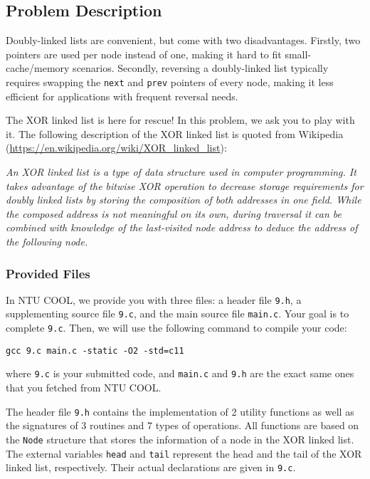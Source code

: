 \setcounter{secnumdepth}{0}

\subsection{Problem Description}\label{problem-description}

Doubly-linked lists are convenient, but come with two disadvantages. Firstly, two pointers are used per node instead of one, making it hard to fit small-cache/memory scenarios. Secondly, reversing a doubly-linked list typically requires swapping the \texttt{next} and \texttt{prev} pointers of every node, making it less efficient for applications with frequent reversal needs.

The XOR linked list is here for rescue! In this problem, we ask you to play with it. The following description of the XOR linked list is quoted from Wikipedia (\url{https://en.wikipedia.org/wiki/XOR_linked_list}): 

{\it
An XOR linked list is a type of data structure used in computer programming. It takes advantage of the bitwise XOR operation to decrease storage requirements for doubly linked lists by storing the composition of both addresses in one field. While the composed address is not meaningful on its own, during traversal it can be combined with knowledge of the last-visited node address to deduce the address of the following node.
}

\subsubsection{Provided Files}\label{provided_files}

In NTU COOL, we provide you with three files: a header file \texttt{9.h}, a supplementing source file \texttt{9.c}, and the main source file \texttt{main.c}. Your goal is to complete \texttt{9.c}. Then, we will use the following command to compile your code:
\begin{center}
\texttt{gcc 9.c main.c -static -O2 -std=c11}
\end{center}
where \texttt{9.c} is your submitted code, and \texttt{main.c} and \texttt{9.h} are the exact same ones that you fetched from NTU COOL. 

The header file \texttt{9.h} contains the implementation of 2 utility functions as well as the signatures of 3 routines and 7 types of operations. All functions are based on the \texttt{Node} structure that stores the information of a node in the XOR linked list. The external variables \texttt{head} and \texttt{tail} represent the head and the tail of the XOR linked list, respectively. Their actual declarations are given in \texttt{9.c}. 

